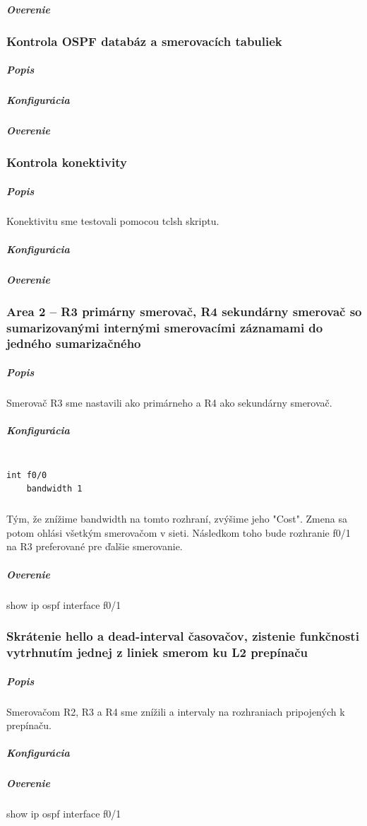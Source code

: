 \documentclass[12pt,twoside,a4paper]{article}
\begin{document}
\subparagraph{Overenie}
\subparagraph{}




\subsubsection*{Kontrola OSPF databáz a smerovacích tabuliek}
\subparagraph{Popis}
\subparagraph{}

\subparagraph{Konfigurácia}

\subparagraph{Overenie}
\subparagraph{}




\subsubsection*{Kontrola konektivity}
\subparagraph{Popis}
\subparagraph{}
Konektivitu sme testovali pomocou tclsh skriptu.

\subparagraph{Konfigurácia}

\subparagraph{Overenie}
\subparagraph{}


\subsubsection*{Area 2 – R3 primárny smerovač, R4 sekundárny smerovač so sumarizovanými internými smerovacími záznamami do jedného sumarizačného}
\subparagraph{Popis}
\subparagraph{}
Smerovač R3 sme nastavili ako primárneho a R4 ako sekundárny smerovač.

\subparagraph{Konfigurácia}
\noindent
{\selectfont
\begin{small}
\begin{verbatim}

int f0/0
    bandwidth 1

\end{verbatim}
\end{small}
}

\subparagraph{}
Tým, že znížime bandwidth na tomto rozhraní, zvýšime jeho "Cost". Zmena sa potom ohlási všetkým smerovačom v sieti. Následkom toho bude rozhranie f0/1 na R3 preferované pre ďalšie smerovanie.

\subparagraph{Overenie}
\subparagraph{}
\noindent
show ip ospf interface f0/1



\subsubsection*{Skrátenie hello a dead-interval časovačov, zistenie funkčnosti vytrhnutím jednej z liniek smerom ku L2 prepínaču}
\subparagraph{Popis}
\subparagraph{}
Smerovačom R2, R3 a R4 sme znížili  a  intervaly na rozhraniach pripojených k prepínaču.

\subparagraph{Konfigurácia}

\subparagraph{Overenie}
\subparagraph{}
\noindent
show ip ospf interface f0/1
\end{document}
